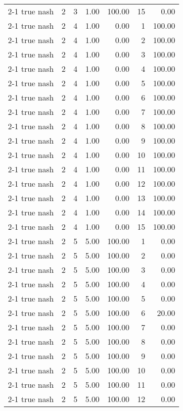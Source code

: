 \begin{tabular}{lrrrrrr}
2-1  true nash & 2 & 3 & 1.00 & 100.00 & 15 & 0.00 \\
2-1  true nash & 2 & 4 & 1.00 & 0.00 & 1 & 100.00 \\
2-1  true nash & 2 & 4 & 1.00 & 0.00 & 2 & 100.00 \\
2-1  true nash & 2 & 4 & 1.00 & 0.00 & 3 & 100.00 \\
2-1  true nash & 2 & 4 & 1.00 & 0.00 & 4 & 100.00 \\
2-1  true nash & 2 & 4 & 1.00 & 0.00 & 5 & 100.00 \\
2-1  true nash & 2 & 4 & 1.00 & 0.00 & 6 & 100.00 \\
2-1  true nash & 2 & 4 & 1.00 & 0.00 & 7 & 100.00 \\
2-1  true nash & 2 & 4 & 1.00 & 0.00 & 8 & 100.00 \\
2-1  true nash & 2 & 4 & 1.00 & 0.00 & 9 & 100.00 \\
2-1  true nash & 2 & 4 & 1.00 & 0.00 & 10 & 100.00 \\
2-1  true nash & 2 & 4 & 1.00 & 0.00 & 11 & 100.00 \\
2-1  true nash & 2 & 4 & 1.00 & 0.00 & 12 & 100.00 \\
2-1  true nash & 2 & 4 & 1.00 & 0.00 & 13 & 100.00 \\
2-1  true nash & 2 & 4 & 1.00 & 0.00 & 14 & 100.00 \\
2-1  true nash & 2 & 4 & 1.00 & 0.00 & 15 & 100.00 \\
2-1  true nash & 2 & 5 & 5.00 & 100.00 & 1 & 0.00 \\
2-1  true nash & 2 & 5 & 5.00 & 100.00 & 2 & 0.00 \\
2-1  true nash & 2 & 5 & 5.00 & 100.00 & 3 & 0.00 \\
2-1  true nash & 2 & 5 & 5.00 & 100.00 & 4 & 0.00 \\
2-1  true nash & 2 & 5 & 5.00 & 100.00 & 5 & 0.00 \\
2-1  true nash & 2 & 5 & 5.00 & 100.00 & 6 & 20.00 \\
2-1  true nash & 2 & 5 & 5.00 & 100.00 & 7 & 0.00 \\
2-1  true nash & 2 & 5 & 5.00 & 100.00 & 8 & 0.00 \\
2-1  true nash & 2 & 5 & 5.00 & 100.00 & 9 & 0.00 \\
2-1  true nash & 2 & 5 & 5.00 & 100.00 & 10 & 0.00 \\
2-1  true nash & 2 & 5 & 5.00 & 100.00 & 11 & 0.00 \\
2-1  true nash & 2 & 5 & 5.00 & 100.00 & 12 & 0.00 \\

\end{tabular}
